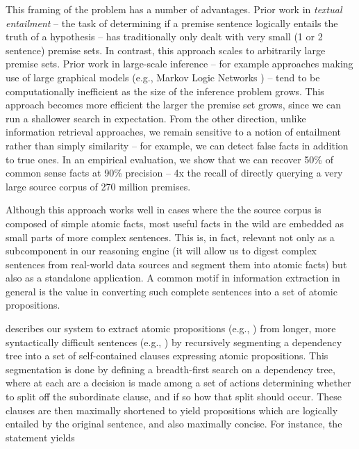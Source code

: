This framing of the problem has a number of advantages.
Prior work in \textit{textual entailment} -- the task of determining if a premise sentence logically entails the
  truth of a hypothesis -- has traditionally only dealt with very small (1 or 2 sentence) premise sets.
In contrast, this approach scales to arbitrarily large premise sets.
Prior work in large-scale inference -- for example approaches making use of large graphical
  models (e.g., Markov Logic Networks \cite{key:2006richardson-mln}) -- tend to be
  computationally inefficient as the size of the inference problem grows.
This approach becomes more efficient the larger the premise set grows, since we can run
  a shallower search in expectation.
From the other direction, unlike information retrieval approaches, we remain 
  sensitive to a notion of entailment rather than simply similarity -- for example, 
  we can detect false facts in addition to true ones.
In an empirical evaluation, we show that we can recover 50\% of common sense facts 
  at 90\% precision -- 4x the recall of directly querying 
  a very large source corpus of 270 million premises.



%
%
Although this approach works well in cases where the the source corpus is composed
  of simple atomic facts, most useful facts in the wild are embedded as small parts
  of more complex sentences.
This is, in fact, relevant not only as a
  subcomponent in our reasoning engine (it will allow us to digest complex
  sentences from real-world data sources and segment them into atomic facts)
  but also as a standalone application.
A common motif in information extraction in general is the value in 
  converting such complete sentences into a set of atomic propositions.

 describes our system to extract atomic propositions (e.g., 
  ) from longer, more syntactically difficult 
  sentences (e.g., ) by recursively 
  segmenting a dependency tree into a set of self-contained clauses expressing 
  atomic propositions.
This segmentation is done by defining a breadth-first search on a dependency tree,
  where at each arc a decision is made among a set of actions determining whether
  to split off the subordinate clause, and if so how that split should occur.
These clauses are then maximally shortened to yield propositions which are
  logically entailed by the original sentence, and also maximally concise.
For instance, the statement 
  yields  

